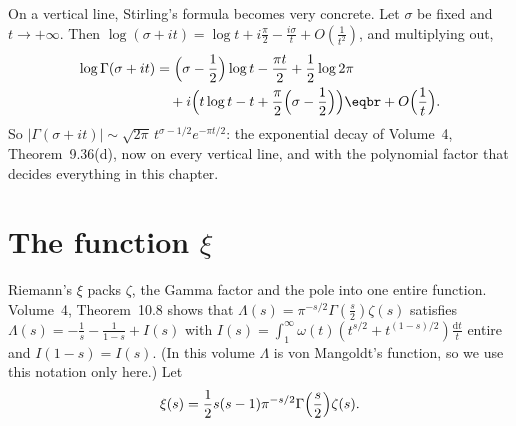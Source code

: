 On a vertical line, Stirling's formula becomes very concrete. Let $\sigma$ be fixed and $t\to+\infty$. Then $\log(\sigma+it)=\log t+i\frac\pi2-\frac{i\sigma}t+O(\frac1{t^2})$, and
multiplying out,
\begin{equation}\label{eq:stirlingvert}
\begin{aligned}\log\Gamma(\sigma+it)&=\Bigl(\sigma-\frac12\Bigr)\log t-\frac{\pi t}2+\frac12\log2\pi\\&\quad+i\Bigl(t\log t-t+\frac\pi2\Bigl(\sigma-\frac12\Bigr)\Bigr)\eqbr+O\Bigl(\frac1t\Bigr).\end{aligned}
\end{equation}
So $|\Gamma(\sigma+it)|\sim\sqrt{2\pi}\,t^{\sigma-1/2}e^{-\pi t/2}$: the exponential decay of Volume~4, Theorem~9.36(d), now on every vertical line, and with the polynomial factor that
decides everything in this chapter.

\section{The function \texorpdfstring{$\xi$}{xi}}

Riemann's $\xi$ packs $\zeta$, the Gamma factor and the pole into one entire function. Volume~4, Theorem~10.8 shows that $\Lambda(s)=\pi^{-s/2}\Gamma(\frac s2)\zeta(s)$ satisfies
$\Lambda(s)=-\frac1s-\frac1{1-s}+I(s)$ with $I(s)=\int_1^\infty\omega(t)(t^{s/2}+t^{(1-s)/2})\frac{\mathrm dt}t$ entire and $I(1-s)=I(s)$. (In this volume $\Lambda$ is von Mangoldt's function, so we
use this notation only here.) Let
\[
\xi(s)=\frac12s(s-1)\pi^{-s/2}\Gamma\Bigl(\frac s2\Bigr)\zeta(s).
\]

